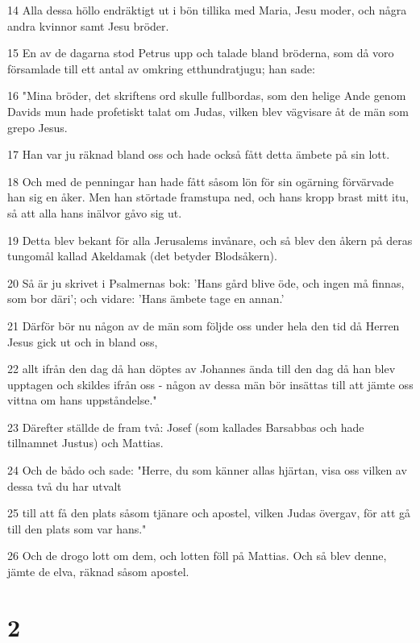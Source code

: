 \par 14 Alla dessa höllo endräktigt ut i bön tillika med Maria, Jesu moder, och några andra kvinnor samt Jesu bröder.
\par 15 En av de dagarna stod Petrus upp och talade bland bröderna, som då voro församlade till ett antal av omkring etthundratjugu; han sade:
\par 16 "Mina bröder, det skriftens ord skulle fullbordas, som den helige Ande genom Davids mun hade profetiskt talat om Judas, vilken blev vägvisare åt de män som grepo Jesus.
\par 17 Han var ju räknad bland oss och hade också fått detta ämbete på sin lott.
\par 18 Och med de penningar han hade fått såsom lön för sin ogärning förvärvade han sig en åker. Men han störtade framstupa ned, och hans kropp brast mitt itu, så att alla hans inälvor gåvo sig ut.
\par 19 Detta blev bekant för alla Jerusalems invånare, och så blev den åkern på deras tungomål kallad Akeldamak (det betyder Blodsåkern).
\par 20 Så är ju skrivet i Psalmernas bok: 'Hans gård blive öde, och ingen må finnas, som bor däri'; och vidare: 'Hans ämbete tage en annan.'
\par 21 Därför bör nu någon av de män som följde oss under hela den tid då Herren Jesus gick ut och in bland oss,
\par 22 allt ifrån den dag då han döptes av Johannes ända till den dag då han blev upptagen och skildes ifrån oss - någon av dessa män bör insättas till att jämte oss vittna om hans uppståndelse."
\par 23 Därefter ställde de fram två: Josef (som kallades Barsabbas och hade tillnamnet Justus) och Mattias.
\par 24 Och de bådo och sade: "Herre, du som känner allas hjärtan, visa oss vilken av dessa två du har utvalt
\par 25 till att få den plats såsom tjänare och apostel, vilken Judas övergav, för att gå till den plats som var hans."
\par 26 Och de drogo lott om dem, och lotten föll på Mattias. Och så blev denne, jämte de elva, räknad såsom apostel.

\chapter{2}

